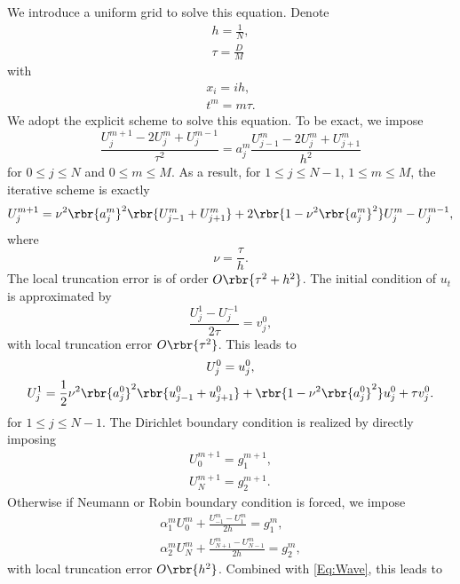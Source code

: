 \documentclass[english, nochinese]{pnote}
\begin{document}
We introduce a uniform grid to solve this equation. Denote
\begin{gather}
h = \frac{1}{N}, \\
\tau = \frac{D}{M}
\end{gather}
with
\begin{gather}
x_i = i h, \\
t^m = m \tau.
\end{gather}
We adopt the explicit scheme to solve this equation. To be exact, we impose
\begin{equation} \label{Eq:Wave}
\frac{ U_j^{ m + 1 } - 2 U_j^m + U_j^{ m - 1 } }{\tau^2} = a_j^m \frac{ U_{ j - 1 }^m - 2 U_j^m + U_{ j + 1 }^m }{h^2}
\end{equation}
for $ 0 \le j \le N $ and $ 0 \le m \le M $. As a result, for $ 1 \le j \le N - 1 $, $ 1 \le m \le M $, the iterative scheme is exactly
\begin{equation}
U_j^{ m + 1 } = \nu^2 \rbr{a_j^m}^2 \rbr{ U_{ j - 1 }^m + U_{ j + 1 }^m } + 2 \rbr{ 1 - \nu^2 \rbr{a_j^m}^2 } U_j^m - U_j^{ m - 1 },
\end{equation}
where
\begin{equation}
\nu = \frac{\tau}{h}.
\end{equation}
The local truncation error is of order $ O \rbr{ \tau^2 + h^2 } $. The initial condition of $u_t$ is approximated by
\begin{equation}
\frac{ U_j^1 - U_j^{-1} }{ 2 \tau } = v^0_j,
\end{equation}
with local truncation error $ O \rbr{\tau^2} $. This leads to
\begin{gather}
U_j^0 = u^0_j, \\
U_j^1 = \frac{1}{2} \nu^2 \rbr{a_j^0}^2 \rbr{ u^0_{ j - 1 } + u^0_{ j + 1 } } + \rbr{ 1 - \nu^2 \rbr{a_j^0}^2 } u^0_j + \tau v^0_j.
\end{gather}
for $ 1 \le j \le N - 1 $.
The Dirichlet boundary condition is realized by directly imposing
\begin{gather}
U_0^{ m + 1 } = g_1^{ m + 1 }, \\
U_N^{ m + 1 } = g_2^{ m + 1 }.
\end{gather}
Otherwise if Neumann or Robin boundary condition is forced, we impose
\begin{gather}
\alpha_1^m U_0^m + \frac{ U_{-1}^m - U_1^m }{ 2 h } = g_1^m, \\
\alpha_2^m U_N^m + \frac{ U_{ N + 1 }^m - U_{ N - 1 }^m }{ 2 h } = g_2^m,
\end{gather}
with local truncation error $ O \rbr{h^2} $. Combined with \eqref{Eq:Wave}, this leads to
\end{document}
